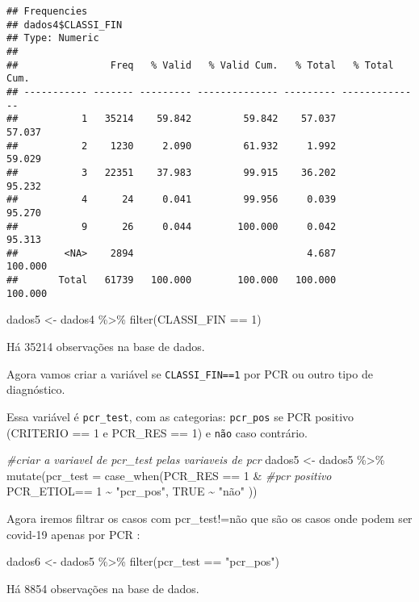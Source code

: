 \documentclass[
]{article}
\newenvironment{Shaded}{\begin{snugshade}}{\end{snugshade}}
\newcommand{\AttributeTok}[1]{\textcolor[rgb]{0.77,0.63,0.00}{#1}}
\newcommand{\CommentTok}[1]{\textcolor[rgb]{0.56,0.35,0.01}{\textit{#1}}}
\newcommand{\ConstantTok}[1]{\textcolor[rgb]{0.00,0.00,0.00}{#1}}
\newcommand{\DecValTok}[1]{\textcolor[rgb]{0.00,0.00,0.81}{#1}}
\newcommand{\FunctionTok}[1]{\textcolor[rgb]{0.00,0.00,0.00}{#1}}
\newcommand{\NormalTok}[1]{#1}
\newcommand{\OtherTok}[1]{\textcolor[rgb]{0.56,0.35,0.01}{#1}}
\newcommand{\SpecialCharTok}[1]{\textcolor[rgb]{0.00,0.00,0.00}{#1}}
\newcommand{\StringTok}[1]{\textcolor[rgb]{0.31,0.60,0.02}{#1}}
\begin{document}
\begin{verbatim}
## Frequencies  
## dados4$CLASSI_FIN  
## Type: Numeric  
## 
##                Freq   % Valid   % Valid Cum.   % Total   % Total Cum.
## ----------- ------- --------- -------------- --------- --------------
##           1   35214    59.842         59.842    57.037         57.037
##           2    1230     2.090         61.932     1.992         59.029
##           3   22351    37.983         99.915    36.202         95.232
##           4      24     0.041         99.956     0.039         95.270
##           9      26     0.044        100.000     0.042         95.313
##        <NA>    2894                              4.687        100.000
##       Total   61739   100.000        100.000   100.000        100.000
\end{verbatim}

\begin{Shaded}
\begin{Highlighting}[]
\NormalTok{dados5 }\OtherTok{\textless{}{-}}\NormalTok{ dados4 }\SpecialCharTok{\%\textgreater{}\%} 
  \FunctionTok{filter}\NormalTok{(CLASSI\_FIN }\SpecialCharTok{==} \DecValTok{1}\NormalTok{)}
\end{Highlighting}
\end{Shaded}

Há 35214 observações na base de dados.

Agora vamos criar a variável se \texttt{CLASSI\_FIN==1} por PCR ou outro
tipo de diagnóstico.

Essa variável é \texttt{pcr\_test}, com as categorias: \texttt{pcr\_pos}
se PCR positivo (CRITERIO == 1 e PCR\_RES == 1) e \texttt{não} caso
contrário.

\begin{Shaded}
\begin{Highlighting}[]
\CommentTok{\#criar a variavel de pcr\_test pelas variaveis de pcr}
\NormalTok{dados5 }\OtherTok{\textless{}{-}}\NormalTok{ dados5 }\SpecialCharTok{\%\textgreater{}\%}
  \FunctionTok{mutate}\NormalTok{(}\AttributeTok{pcr\_test =} \FunctionTok{case\_when}\NormalTok{(PCR\_RES }\SpecialCharTok{==} \DecValTok{1} \SpecialCharTok{\&} \CommentTok{\#pcr positivo }
\NormalTok{                                PCR\_ETIOL}\SpecialCharTok{==} \DecValTok{1}  \SpecialCharTok{\textasciitilde{}} \StringTok{"pcr\_pos"}\NormalTok{,}
                              \ConstantTok{TRUE} \SpecialCharTok{\textasciitilde{}} \StringTok{"não"}
\NormalTok{                              ))}
\end{Highlighting}
\end{Shaded}

Agora iremos filtrar os casos com pcr\_test!=não que são os casos onde
podem ser covid-19 apenas por PCR :

\begin{Shaded}
\begin{Highlighting}[]
\NormalTok{dados6 }\OtherTok{\textless{}{-}}\NormalTok{ dados5 }\SpecialCharTok{\%\textgreater{}\%} 
  \FunctionTok{filter}\NormalTok{(pcr\_test }\SpecialCharTok{==} \StringTok{"pcr\_pos"}\NormalTok{)}
\end{Highlighting}
\end{Shaded}

Há 8854 observações na base de dados.
\end{document}
